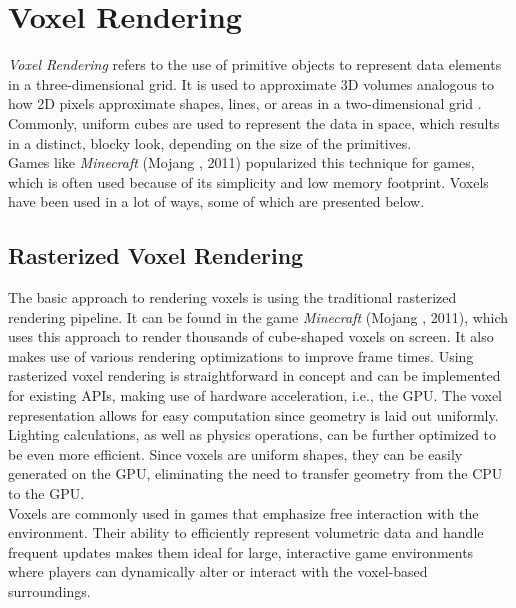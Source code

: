 \section{Voxel Rendering} \label{sec-voxel-rendering}

\noindent
\emph{Voxel Rendering} refers to the use of primitive objects to represent data elements in a three-dimensional 
grid. It is used to approximate 3D volumes analogous to how 2D pixels approximate shapes, lines, or areas in a 
two-dimensional grid \cite{MegaVoxels2023}. Commonly, uniform cubes are used to represent the data in space, 
which results in a distinct, blocky look, depending on the size of the primitives. \\

\noindent
Games like \emph{Minecraft} (Mojang \cite{Mojang2024}, 2011) popularized this technique for games, which is 
often used because of its simplicity and low memory footprint. Voxels have been used in a lot of ways, 
some of which are presented below.


\subsection*{Rasterized Voxel Rendering} \label{subsec-rasterized-voxel-rendering}

The basic approach to rendering voxels is using the traditional rasterized rendering pipeline.
It can be found in the game \emph{Minecraft} (Mojang \cite{Mojang2024}, 2011), which uses 
this approach to render thousands of cube-shaped voxels on screen. It also makes use of various 
rendering optimizations to improve frame times. Using rasterized voxel rendering is straightforward 
in concept and can be implemented for existing \ac{API}s, making use of hardware acceleration, i.e., 
the \ac{GPU}. The voxel representation allows for easy computation since geometry is laid out 
uniformly. Lighting calculations, as well as physics operations, can be further optimized to be 
even more efficient. Since voxels are uniform shapes, they can be easily generated on the \ac{GPU}, 
eliminating the need to transfer geometry from the \ac{CPU} to the \ac{GPU}. \\

\noindent
Voxels are commonly used in games that emphasize free interaction with the environment. Their ability 
to efficiently represent volumetric data and handle frequent updates makes them ideal for large, 
interactive game environments where players can dynamically alter or interact with the voxel-based 
surroundings. \\

